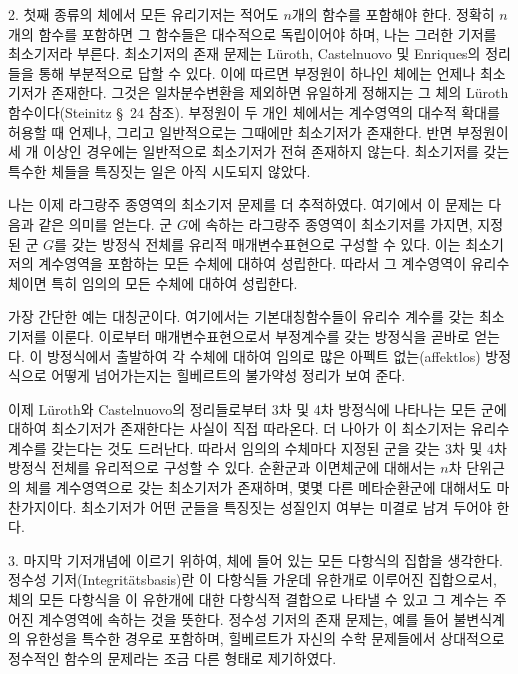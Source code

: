 2. 첫째 종류의 체에서 모든 유리기저는 적어도 $n$개의 함수를 포함해야 한다. 정확히 $n$개의 함수를 포함하면 그 함수들은 대수적으로 독립이어야 하며, 나는 그러한 기저를 \glqq{}최소기저\grqq{}라 부른다. 최소기저의 존재 문제는 Lüroth, Castelnuovo 및 Enriques의 정리들을 통해 부분적으로 답할 수 있다. 이에 따르면 부정원이 하나인 체에는 언제나 최소기저가 존재한다. 그것은 일차분수변환을 제외하면 유일하게 정해지는 그 체의 Lüroth 함수이다(Steinitz \S\ 24 참조). 부정원이 두 개인 체에서는 계수영역의 대수적 확대를 허용할 때 언제나, 그리고 일반적으로는 그때에만 최소기저가 존재한다. 반면 부정원이 세 개 이상인 경우에는 일반적으로 최소기저가 전혀 존재하지 않는다. 최소기저를 갖는 특수한 체들을 특징짓는 일은 아직 시도되지 않았다.

나는 이제 라그랑주 종영역의 최소기저 문제를 더 추적하였다. 여기에서 이 문제는 다음과 같은 의미를 얻는다. \glqq{}군 $G$에 속하는 라그랑주 종영역이 최소기저를 가지면, 지정된 군 $G$를 갖는 방정식 전체를 유리적 매개변수표현으로 구성할 수 있다. 이는 최소기저의 계수영역을 포함하는 모든 수체에 대하여 성립한다. 따라서 그 계수영역이 유리수체이면 특히 임의의 모든 수체에 대하여 성립한다.\grqq{}

가장 간단한 예는 대칭군이다. 여기에서는 기본대칭함수들이 유리수 계수를 갖는 최소기저를 이룬다. 이로부터 매개변수표현으로서 부정계수를 갖는 방정식을 곧바로 얻는다. 이 방정식에서 출발하여 각 수체에 대하여 임의로 많은 아펙트 없는(affektlos) 방정식으로 어떻게 넘어가는지는 힐베르트의 불가약성 정리가 보여 준다.

이제 Lüroth와 Castelnuovo의 정리들로부터 3차 및 4차 방정식에 나타나는 모든 군에 대하여 최소기저가 존재한다는 사실이 직접 따라온다. 더 나아가 이 최소기저는 유리수 계수를 갖는다는 것도 드러난다. 따라서 임의의 수체마다 지정된 군을 갖는 3차 및 4차 방정식 전체를 유리적으로 구성할 수 있다. 순환군과 이면체군에 대해서는 $n$차 단위근의 체를 계수영역으로 갖는 최소기저가 존재하며, 몇몇 다른 메타순환군에 대해서도 마찬가지이다. 최소기저가 어떤 군들을 특징짓는 성질인지 여부는 미결로 남겨 두어야 한다.

3. 마지막 기저개념에 이르기 위하여, 체에 들어 있는 모든 다항식의 집합을 생각한다. \glqq{}정수성 기저(Integritätsbasis)\grqq{}란 이 다항식들 가운데 유한개로 이루어진 집합으로서, 체의 모든 다항식을 이 유한개에 대한 다항식적 결합으로 나타낼 수 있고 그 계수는 주어진 계수영역에 속하는 것을 뜻한다. 정수성 기저의 존재 문제는, 예를 들어 불변식계의 유한성을 특수한 경우로 포함하며, 힐베르트가 자신의 \glqq{}수학 문제들\grqq{}에서 상대적으로 정수적인 함수의 문제라는 조금 다른 형태로 제기하였다.

